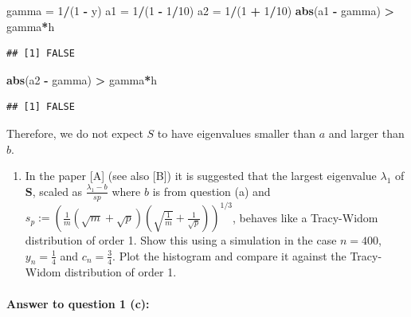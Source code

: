 \documentclass[
]{article}
\newenvironment{Shaded}{\begin{snugshade}}{\end{snugshade}}
\newcommand{\DecValTok}[1]{\textcolor[rgb]{0.00,0.00,0.81}{#1}}
\newcommand{\FunctionTok}[1]{\textcolor[rgb]{0.13,0.29,0.53}{\textbf{#1}}}
\newcommand{\NormalTok}[1]{#1}
\newcommand{\OtherTok}[1]{\textcolor[rgb]{0.56,0.35,0.01}{#1}}
\newcommand{\SpecialCharTok}[1]{\textcolor[rgb]{0.81,0.36,0.00}{\textbf{#1}}}
\providecommand{\tightlist}{%
  \setlength{\itemsep}{0pt}\setlength{\parskip}{0pt}}
\begin{document}
\begin{Shaded}
\begin{Highlighting}[]
\NormalTok{gamma }\OtherTok{=} \DecValTok{1}\SpecialCharTok{/}\NormalTok{(}\DecValTok{1} \SpecialCharTok{{-}}\NormalTok{ y)}
\NormalTok{a1 }\OtherTok{=} \DecValTok{1}\SpecialCharTok{/}\NormalTok{(}\DecValTok{1} \SpecialCharTok{{-}} \DecValTok{1}\SpecialCharTok{/}\DecValTok{10}\NormalTok{)}
\NormalTok{a2 }\OtherTok{=} \DecValTok{1}\SpecialCharTok{/}\NormalTok{(}\DecValTok{1} \SpecialCharTok{+} \DecValTok{1}\SpecialCharTok{/}\DecValTok{10}\NormalTok{)}
\FunctionTok{abs}\NormalTok{(a1 }\SpecialCharTok{{-}}\NormalTok{ gamma) }\SpecialCharTok{\textgreater{}}\NormalTok{ gamma}\SpecialCharTok{*}\NormalTok{h}
\end{Highlighting}
\end{Shaded}

\begin{verbatim}
## [1] FALSE
\end{verbatim}

\begin{Shaded}
\begin{Highlighting}[]
\FunctionTok{abs}\NormalTok{(a2 }\SpecialCharTok{{-}}\NormalTok{ gamma) }\SpecialCharTok{\textgreater{}}\NormalTok{ gamma}\SpecialCharTok{*}\NormalTok{h}
\end{Highlighting}
\end{Shaded}

\begin{verbatim}
## [1] FALSE
\end{verbatim}

Therefore, we do not expect \(S\) to have eigenvalues smaller than \(a\)
and larger than \(b\).

\begin{enumerate}
\def\labelenumi{(\alph{enumi})}
\setcounter{enumi}{2}
\tightlist
\item
  In the paper {[}A{]} (see also {[}B{]}) it is suggested that the
  largest eigenvalue \(\lambda_1\) of \(\mathbf{S}\), scaled as
  \(\frac{\lambda_1 - b}{sp}\) where \(b\) is from question (a) and
  \(s_p := \left( \frac{1}{m} (\sqrt{m} + \sqrt{p})(\sqrt{\frac{1}{m}} + \frac{1}{\sqrt{p}}) \right)^{1/3}\),
  behaves like a Tracy-Widom distribution of order 1. Show this using a
  simulation in the case \(n = 400\), \(y_n = \frac{1}{4}\) and
  \(c_n = \frac{3}{4}\). Plot the histogram and compare it against the
  Tracy-Widom distribution of order 1.
\end{enumerate}

\paragraph{\texorpdfstring{\textbf{Answer to question 1
(c)}:}{Answer to question 1 (c):}}\label{answer-to-question-1-c}
\end{document}
